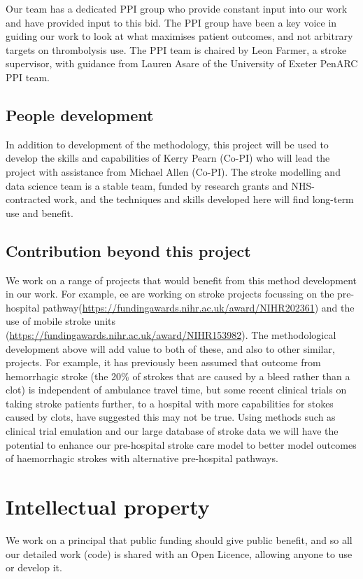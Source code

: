 Our team has a dedicated PPI group who provide constant input into our work and have provided input to this bid. The PPI group have been a key voice in guiding our work to look at what maximises patient outcomes, and not arbitrary targets on thrombolysis use. The PPI team is chaired by Leon Farmer, a stroke supervisor, with guidance from Lauren Asare of the University of Exeter PenARC PPI team.

\subsection{People development}

In addition to development of the methodology, this project will be used to develop the skills and capabilities of Kerry Pearn (Co-PI) who will lead the project with assistance from Michael Allen (Co-PI). The stroke modelling and data science team is a stable team, funded by research grants and NHS-contracted work, and the techniques and skills developed here will find long-term use and benefit.

\subsection{Contribution beyond this project}

We work on a range of projects that would benefit from this method development in our work. For example, ee are working on stroke projects focussing on the pre-hospital pathway(\url{https://fundingawards.nihr.ac.uk/award/NIHR202361}) and the use of mobile stroke units (\url{https://fundingawards.nihr.ac.uk/award/NIHR153982}). The methodological development above will add value to both of these, and also to other similar, projects. For example, it has previously been assumed that outcome from hemorrhagic stroke (the 20\% of strokes that are caused by a bleed rather than a clot) is independent of ambulance travel time, but some recent clinical trials on taking stroke patients further, to a hospital with more capabilities for stokes caused by clots, have suggested this may not be true. Using methods such as clinical trial emulation and our large database of stroke data we will have the potential to enhance our pre-hospital stroke care model to better model outcomes of haemorrhagic strokes with alternative pre-hospital pathways.

\section{Intellectual property}

We work on a principal that public funding should give public benefit, and so all our detailed work (code) is shared with an Open Licence, allowing anyone to use or develop it.

